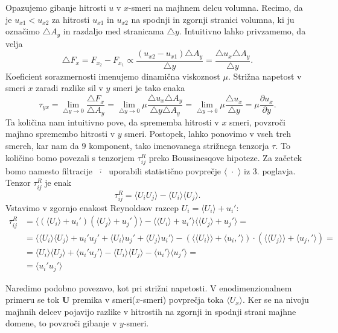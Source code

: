 \documentclass[mat2, tisk]{fmfdelo}
\newcommand{\bd}{\textbf}
\begin{document}
Opazujemo gibanje hitrosti $u$ v $x$-smeri na majhnem delcu volumna. Recimo, da je $u_{x1} < u_{x2}$ 
za hitrosti $u_{x1}$ in $u_{x2}$ na spodnji in zgornji stranici volumna, ki ju označimo $\triangle A_y$
in razdaljo med stranicama $\triangle y$. Intuitivno lahko privzamemo, da velja 
$$
\triangle F_x = F_{x_2} - F_{x_1} \propto \frac{(u_{x2} - u_{x1})\triangle A_y}{\triangle y} = \frac{\triangle u_x\triangle A_y}{\triangle y}.
$$
Koeficient sorazmernosti imenujemo dinamična viskoznost $\mu$. Strižna napetost 
v smeri $x$ zaradi razlike sil v $y$ smeri je tako enaka
$$
\tau_{yx} = \lim_{\triangle y \rightarrow 0} \frac{\triangle F_x}{\triangle A_y} = 
\lim_{\triangle y \rightarrow 0} \mu \frac{\triangle u_x \triangle A_y}{\triangle y\triangle A_y} = 
\lim_{\triangle y \rightarrow 0} \mu \frac{\triangle u_x}{\triangle y} = \mu \frac{\partial u_x}{\partial y}.
$$
Ta količina nam intuitivno pove, da sprememba hitrosti v $x$ smeri, povzroči majhno spremembo hitrosti v $y$
smeri. Postopek, lahko ponovimo v vseh treh smereh, kar nam da $9$ komponent, tako imenovanega 
strižnega tenzorja $\tau$. To količino bomo povezali s tenzorjem $\tau_{ij}^R$ preko 
Boussinesqove hipoteze. Za začetek bomo namesto filtracije $\overline{\,\,\cdot\,\,}$ uporabili 
statistično povprečje $\langle\,\, \cdot \,\,\rangle$ iz 3. poglavja. Tenzor $\tau_{ij}^R$ je 
enak 
$$
\tau_{ij}^R = \langle U_i U_j \rangle - \langle U_i \rangle \langle U_j \rangle.
$$
Vstavimo v zgornjo enakost Reynoldsov razcep $U_i = \langle U_i \rangle + u_i'$: 
\begin{align*}
\tau_{ij}^R &= \langle (\langle U_i \rangle + u_i')(\langle U_j \rangle + u_j') \rangle - \langle \langle U_i \rangle + u_i' \rangle \langle \langle U_j \rangle + u_j' \rangle = \\
&= \langle \langle U_i \rangle \langle U_j \rangle + u_i' u_j' + \langle U_i \rangle u_j' + \langle U_j \rangle u_i' \rangle - (\langle\langle U_i \rangle\rangle +\langle u_i,'\rangle) \cdot (\langle\langle U_j \rangle\rangle + \langle u_j,'\rangle) = \\[2mm]
&= \langle U_i\rangle \langle U_j \rangle + \langle u_i' u_j' \rangle - \langle U_i \rangle \langle U_j \rangle - \langle u_i' \rangle \langle u_j' \rangle = \\
&= \langle u_i' u_j' \rangle
\end{align*}

Naredimo podobno povezavo, kot pri strižni napetosti. V enodimenzionalnem primeru se 
tok $\bd{U}$ premika v smeri($x$-smeri) povprečja toka $\langle U_x \rangle$. Ker se na 
nivoju majhnih delcev pojavijo razlike v hitrostih na zgornji in spodnji strani majhne domene, 
to povzroči gibanje v $y$-smeri. 
\end{document}
